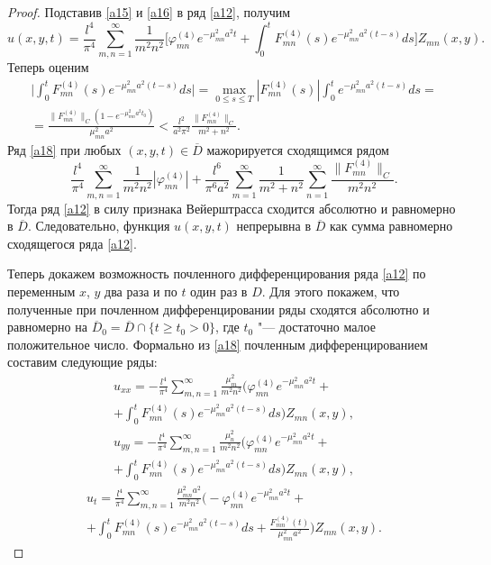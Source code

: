 \begin{proof}
Подставив \eqref{a15} и \eqref{a16} в ряд \eqref{a12}, получим
\begin{equation}
\label{a18}
u(x,y,t)=\frac{l^4}{\pi^4}\sum_{m,n=1}^\infty\frac{1}{m^2n^2}\biggl[\varphi^{(4)}_{mn}e^{-\mu_{mn}^2a^2t}+\int_0^tF^{(4)}_{mn}(s)e^{-\mu_{mn}^2a^2(t-s)}ds\biggr]
Z_{mn}(x,y).
\end{equation}
Теперь оценим
\begin{multline}
\biggl|\int_0^tF^{(4)}_{mn}(s)e^{-\mu_{mn}^2a^2(t-s)}ds\biggr|=
\max\limits_{0\leqslant s\leqslant T}
|F^{(4)}_{mn}(s)|\int_0^te^{-\mu_{mn}^2a^2(t-s)}ds=
\\
=\frac{\|F^{(4)}_{mn}\|_C(1-e^{-\mu_{mn}^2a^2t_0})}{\mu_{mn}^2a^2}<\frac{l^2}{a^2\pi^2}\frac{\|F^{(4)}_{mn}\|_C}{m^2+n^2}.
\end{multline}
Ряд \eqref{a18} при любых $(x,y,t)\in \overline{D}$ мажорируется сходящимся рядом
\begin{equation}
\label{a19}
\frac{l^4}{\pi^4}\sum_{m,n=1}^{\infty}\frac{1}{m^2n^2}|\varphi^{(4)}_{mn}|+\frac{l^6}{\pi^6a^2}\sum_{m=1}^\infty\frac{1}{m^2+n^2} \sum_{n=1}^\infty\frac{\|F^{(4)}_{mn}\|_C}{m^2n^2}.
\end{equation}
Тогда ряд \eqref{a12} в силу признака Вейерштрасса сходится абсолютно и равномерно в $\overline{D}$. 
Следовательно, функция $u(x,y,t)$ непрерывна в $\overline{D}$ как сумма равномерно сходящегося ряда \eqref{a12}.

Теперь докажем возможность почленного дифференцирования ряда \eqref{a12} по переменным $x$, $y$ два раза и по $t$ один раз в $D$. 
Для этого покажем, что полученные при почленном дифференцировании ряды сходятся абсолютно и равномерно на $\overline{D}_0=\overline{D}\cap\{t\geqslant t_0>0\}$, где $t_0$ "--- достаточно малое положительное число. 
Формально из \eqref{a18} почленным дифференцированием составим следующие ряды:
\begin{multline}
\label{a20}u_{xx}=-\frac{l^4}{\pi^4}\sum_{m,n=1}^\infty\frac{\mu_m^2}{m^2n^2}\biggl(\varphi^{(4)}_{mn}e^{-\mu_{mn}^2a^2t}+
\\
+
\int_0^tF^{(4)}_{mn}(s)e^{-\mu_{mn}^2a^2(t-s)}ds\biggr)Z_{mn}(x,y),
\end{multline}
\begin{multline}
\label{a22}
u_{yy}=-\frac{l^4}{\pi^4}\sum_{m,n=1}^\infty\frac{\mu_n^2}{m^2n^2}\biggl(\varphi^{(4)}_{mn}e^{-\mu_{mn}^2a^2t}+ \\+
\int_0^tF^{(4)}_{mn}(s)e^{-\mu_{mn}^2a^2(t-s)}ds\biggr)Z_{mn}(x,y),
\end{multline}
\begin{multline}\label{a22}u_t=\frac{l^4}{\pi^4}\sum_{m,n=1}^\infty\frac{\mu_{mn}^2a^2}{m^2n^2}\biggl(-\varphi^{(4)}_{mn}e^{-\mu_{mn}^2a^2t}+ 
\\
+\int_0^tF^{(4)}_{mn}(s)e^{-\mu_{mn}^2a^2(t-s)}ds+\frac{F_{mn}^{(4)}(t)}{\mu_{mn}^2a^2}\biggr) Z_{mn}(x,y).
\end{multline}


\end{proof}
